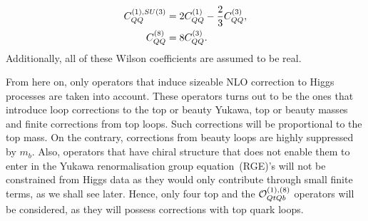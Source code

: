 \begin{align}
C_{QQ}^{(1),SU(3)} &= 2 C_{QQ}^{(1)} -\frac{2}{3} C_{QQ}^{(3)}, \nonumber \\
C_{QQ}^{(8)} &= 8 C_{QQ}^{(3)}.
\end{align}
Additionally, all of these Wilson coefficients are assumed to be real.\\
\par  From here on, only operators that induce sizeable NLO correction to Higgs processes are taken into account. These operators turns out to be the ones that introduce loop corrections to the top or beauty Yukawa, top or beauty masses and finite corrections from top loops. Such corrections will be proportional to the top mass. On the contrary, corrections from beauty loops are highly suppressed by $m_b$. Also, operators that have chiral structure that does not enable them to enter in the Yukawa renormalisation group equation~(RGE)'s will not be constrained from Higgs data as they would only contribute through small finite terms, as we shall see later.  Hence, only four top and the  ${\cal O}_{QtQb}^{(1),(8)}$ operators will be considered, as they will possess corrections with top quark loops.

